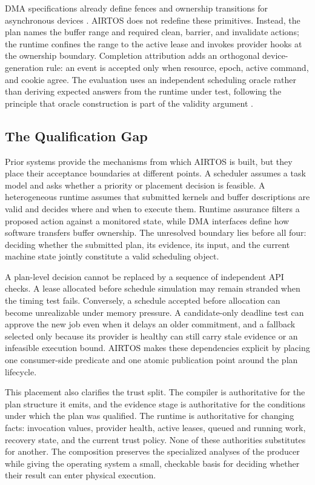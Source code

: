 \documentclass[lettersize,journal]{IEEEtran}
\begin{document}
DMA specifications already define fences and ownership transitions for
asynchronous devices \cite{documentation2026buffer,documentation2026dma}.
AIRTOS does not redefine these primitives. Instead, the plan names the buffer
range and required clean, barrier, and invalidate actions; the runtime confines
the range to the active lease and invokes provider hooks at the ownership
boundary. Completion attribution adds an orthogonal device-generation rule:
an event is accepted only when resource, epoch, active command, and cookie
agree. The evaluation uses an independent scheduling oracle rather than
deriving expected answers from the runtime under test, following the principle
that oracle construction is part of the validity argument \cite{barr2015oracle}.

\subsection{The Qualification Gap}
Prior systems provide the mechanisms from which AIRTOS is built, but they
place their acceptance boundaries at different points. A scheduler assumes a
task model and asks whether a priority or placement decision is feasible. A
heterogeneous runtime assumes that submitted kernels and buffer descriptions
are valid and decides where and when to execute them. Runtime assurance
filters a proposed action against a monitored state, while DMA interfaces
define how software transfers buffer ownership. The unresolved boundary lies
before all four: deciding whether the submitted plan, its evidence, its input,
and the current machine state jointly constitute a valid scheduling object.

A plan-level decision cannot be replaced by a sequence of independent API
checks. A lease allocated before schedule simulation may remain stranded when
the timing test fails. Conversely, a schedule accepted before allocation can
become unrealizable under memory pressure. A candidate-only deadline test can
approve the new job even when it delays an older commitment, and a fallback
selected only because its provider is healthy can still carry stale evidence
or an infeasible execution bound. AIRTOS makes these dependencies explicit by
placing one consumer-side predicate and one atomic publication point around
the plan lifecycle.

This placement also clarifies the trust split. The compiler is authoritative
for the plan structure it emits, and the evidence stage is authoritative for
the conditions under which the plan was qualified. The runtime is
authoritative for changing facts: invocation values, provider health, active
leases, queued and running work, recovery state, and the current trust policy.
None of these authorities substitutes for another. The composition preserves
the specialized analyses of the producer while giving the operating system a
small, checkable basis for deciding whether their result can enter physical
execution.
\end{document}
